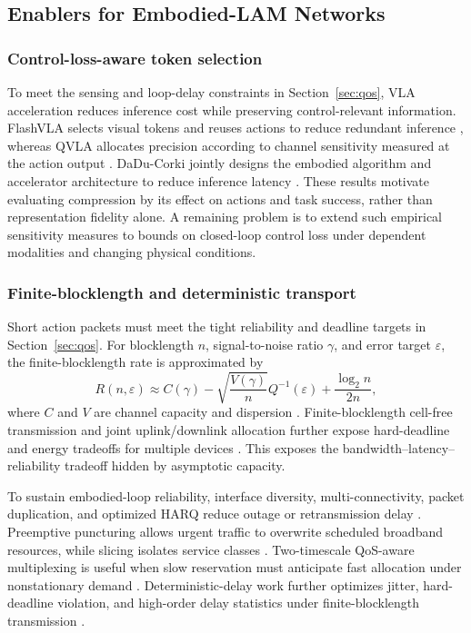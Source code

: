 \documentclass[letterpaper,journal]{IEEEtran}
\begin{document}
\subsection{Enablers for Embodied-LAM Networks}
\subsubsection{Control-loss-aware token selection}
To meet the sensing and loop-delay constraints in Section~\ref{sec:qos},
VLA acceleration reduces inference cost while preserving control-relevant
information.
FlashVLA selects visual tokens and reuses actions to reduce redundant
inference \cite{flashvla}, whereas QVLA allocates precision according to
channel sensitivity measured at the action output \cite{qvla}. DaDu-Corki
jointly designs the embodied algorithm and accelerator architecture to
reduce inference latency \cite{dadu}. These results
motivate evaluating compression by its effect on actions and task success,
rather than representation fidelity alone. A remaining problem is to extend
such empirical sensitivity measures to bounds on closed-loop control loss
under dependent modalities and changing physical conditions.

\subsubsection{Finite-blocklength and deterministic transport}
Short action packets must meet the tight reliability and deadline targets
in Section~\ref{sec:qos}.
For blocklength $n$, signal-to-noise ratio $\gamma$, and error target
$\varepsilon$, the finite-blocklength rate is approximated by
\begin{equation}
R(n,\varepsilon)\approx C(\gamma)
-\sqrt{\frac{V(\gamma)}{n}}Q^{-1}(\varepsilon)
+\frac{\log_2 n}{2n},
\label{eq:fbl}
\end{equation}
where $C$ and $V$ are channel capacity and dispersion
\cite{polyanskiy}. Finite-blocklength cell-free transmission and joint
uplink/downlink allocation further expose hard-deadline and energy tradeoffs
for multiple devices \cite{cellfree,resourceurlcc}. This exposes the
bandwidth--latency--reliability tradeoff hidden by asymptotic capacity.

To sustain embodied-loop reliability, interface diversity, multi-connectivity,
packet duplication, and optimized
HARQ reduce outage or retransmission delay \cite{interfacediversity,harq}.
Preemptive puncturing allows urgent traffic to overwrite scheduled broadband
resources, while slicing isolates service classes
\cite{puncturing,ranslicing,mobileran}. Two-timescale QoS-aware multiplexing
is useful when slow reservation must anticipate fast allocation under
nonstationary demand \cite{unifiedqos}. Deterministic-delay work further
optimizes jitter, hard-deadline violation, and high-order delay statistics
under finite-blocklength transmission \cite{mixedjitter,deterministic}.
\end{document}
